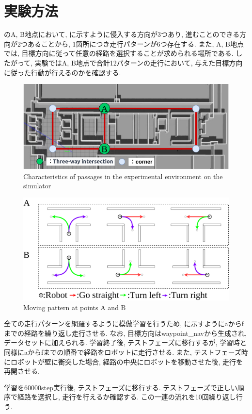   \section{実験方法}
  のA, B地点において, に示すように侵入する方向が3つあり, 進むことのできる方向が2つあることから, 1箇所につき走行パターンが6つ存在する. 
また, A, B地点では, 目標方向に従って任意の経路を選択することが求められる場所である.
したがって, 実験ではA, B地点で合計12パターンの走行において, 与えた目標方向に従った行動が行えるのかを確認する.

\begin{figure}[hbtp]
  \centering
 \includegraphics[keepaspectratio, scale=0.5]
      {images/sim_explain.png}
 \caption{Characteristics of passages in the experimental environment on the simulator}
 \label{Fig:sim_explain}
\end{figure}

\begin{figure}[hbtp]
  \centering
 \includegraphics[keepaspectratio, scale=0.15]
      {images/select.png}
 \caption{Moving pattern at points A and B}
 \label{Fig:select}
\end{figure}

全ての走行パターンを網羅するように模倣学習を行うため, に示すようにaからfまでの経路を繰り返し走行させる. なお, 目標方向はwaypoint\_navから生成され, データセットに加えられる. 学習終了後, テストフェーズに移行するが, 学習時と同様にaからfまでの順番で経路をロボットに走行させる. また, テストフェーズ時にロボットが壁に衝突した場合, 経路の中央にロボットを移動させた後, 走行を再開させる.
\par
 学習を60000step実行後, テストフェーズに移行する. テストフェーズで正しい順序で経路を選択し, 走行を行えるか確認する. この一連の流れを10回繰り返し行う.

